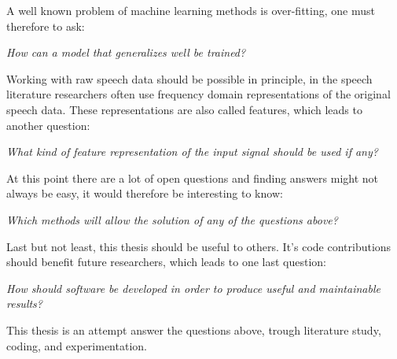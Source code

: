 A well known problem of machine learning methods is over-fitting, one must therefore to ask:

\noindent \textit{How can a model that generalizes well be trained?}
 

Working with raw speech data should be possible in principle, in the speech literature researchers often use frequency domain representations of the original speech data. These representations are also called features, which leads to another question:

\noindent \textit{What kind of feature representation of the input signal should be used if any?}

At this point there are a lot of open questions and finding answers might not always be easy, it would therefore be interesting to know: 

\noindent \textit{Which methods will allow the solution of any of the questions above?}

Last but not least, this thesis should be useful to others. It's code contributions should benefit future researchers, which leads to one last question:

\noindent \textit{How should software be developed in order to produce useful and maintainable results?}

This thesis is an attempt answer the questions above, trough literature study, coding, and experimentation.



